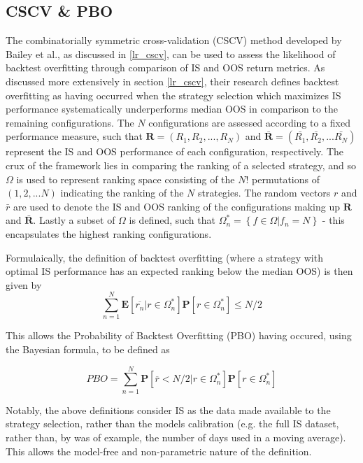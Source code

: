\documentclass[a4paper,11pt,oneside]{article}
\theoremstyle{plain}
\theoremstyle{definition}
\begin{document}
	
	\subsection{CSCV \& PBO}\label{imp_cscv}
	
	The  combinatorially symmetric cross-validation (CSCV) method developed by Bailey et al., as discussed in \ref{lr_cscv}, can be used to assess the likelihood of backtest overfitting through comparison of IS and OOS return metrics. As discussed more extensively in section \ref{lr_cscv}, their research defines backtest overfitting as having
	occurred when the strategy selection which maximizes IS performance systematically underperforms median OOS in comparison to the remaining configurations. The $N$  configurations are assessed according to a fixed performance measure, such that $\mathbf{R} = (R_1, R_2, ..., R_N)$ and $\mathbf{\bar{R}} = (\bar{R_1}, \bar{R_2},... \bar{R_N})$ represent the IS and OOS performance of each configuration, respectively. The crux of the framework lies in comparing the ranking of a selected strategy, and so $\Omega$ is used to represent ranking space consisting of the $N!$ permutations of $(1,2,...N)$ indicating the ranking of the $N$ strategies. The random vectors $r$ and $\bar{r}$ are used to denote the IS and OOS ranking of the configurations making up $\mathbf{R}$ and $\mathbf{\bar{R}}$. Lastly a subset of $\Omega$ is defined, such that $\Omega_{n}^{*}=\left\{f \in \Omega | f_{n}=N\right\}$ - this encapsulates the highest ranking configurations. \newline
	
	
	Formulaically, the definition of backtest overfitting (where a strategy with optimal IS performance has an expected ranking below the median OOS) is then given by
	\begin{equation}\label{eq:PBO1}
	\sum_{n=1}^{N}\mathbf{E}[\overline{r_n}|r\in 
	\Omega_{n}^{*}]\mathbf{P}[r\in\Omega_{n}^{*}]\leq{N/2}
	\end{equation}
	
	This allows the Probability of Backtest Overfitting (PBO) having occured, using the Bayesian formula, to be defined as 
	
	\begin{equation}\label{eq:PBO2}
	PBO = \sum_{n=1}^{N}\mathbf{P}[\overline{r} < {N/2}|r\in\Omega_{n}^{*}]\mathbf{P}[r\in\Omega_{n}^{*}]
	\end{equation}
	
	Notably, the above definitions consider IS as the data made available to the strategy selection, rather than the 
	models calibration (e.g. the full IS dataset, rather than, by was of example, the number of days used in a moving average). 
	This allows the model-free and non-parametric nature of the definition. 
	\hfill \break 
	
\end{document}
